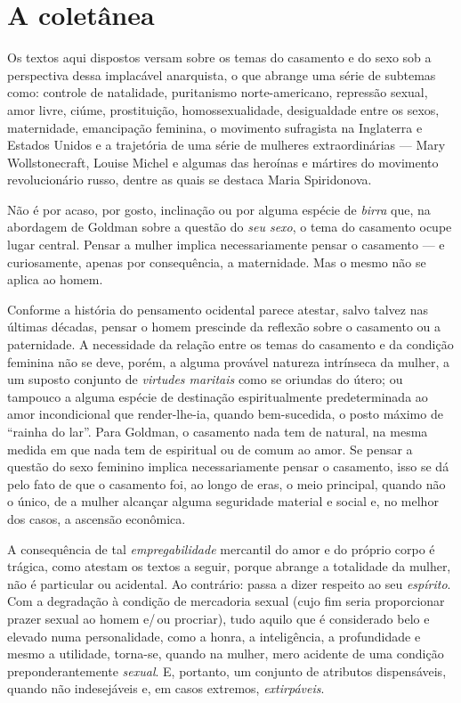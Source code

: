 \section{A coletânea}

Os textos aqui dispostos versam sobre os temas do casamento e do sexo
sob a perspectiva dessa implacável anarquista, o que abrange uma série
de subtemas como: controle de natalidade, puritanismo
norte-americano, repressão sexual, amor livre, ciúme,
prostituição, homossexualidade, desigualdade entre os sexos,
maternidade, emancipação feminina, o movimento sufragista na
Inglaterra e Estados Unidos e a trajetória de uma série de mulheres
extraordinárias --- Mary Wollstonecraft, Louise Michel e algumas das
heroínas e mártires do movimento revolucionário russo, dentre as quais
se destaca Maria Spiridonova.

Não é por acaso, por gosto, inclinação ou por alguma espécie de
\textit{birra} que, na abordagem de Goldman sobre a questão do \textit{seu sexo},
o tema do casamento ocupe lugar central. Pensar a mulher implica
necessariamente pensar o casamento --- e curiosamente, apenas por
consequência, a maternidade.
Mas o mesmo não se aplica ao homem.

Conforme a história do pensamento ocidental parece atestar,
salvo talvez nas últimas décadas, pensar o homem prescinde da
reflexão sobre o casamento ou a paternidade. A necessidade da
relação entre os temas do casamento e da condição feminina não se deve,
porém, a alguma provável natureza intrínseca da mulher, a um suposto
conjunto de \textit{virtudes maritais} como se oriundas do útero; ou tampouco
a alguma espécie de destinação espiritualmente predeterminada ao amor
incondicional que render-lhe-ia, quando bem-sucedida, o posto máximo de
``rainha do lar''. Para Goldman, o casamento nada tem de natural, na
mesma medida em que nada tem de espiritual ou de comum ao amor. Se
pensar a questão do sexo feminino implica necessariamente pensar o
casamento, isso se dá pelo fato de que o casamento foi, ao longo de
eras, o meio principal, quando não o único, de a mulher alcançar alguma
seguridade material e social e, no melhor dos casos, a
ascensão econômica.

A consequência de tal \textit{empregabilidade} mercantil do amor e do próprio
corpo é trágica, como atestam os textos a seguir, porque abrange
a totalidade da mulher, não é particular ou acidental.
Ao contrário: passa a dizer respeito ao seu
\textit{espírito}. Com a degradação à condição de mercadoria sexual (cujo
fim seria proporcionar prazer sexual ao homem e/\,ou procriar),
tudo aquilo que é considerado belo e elevado numa personalidade, como a
honra, a inteligência, a profundidade e mesmo a utilidade, torna-se,
quando na mulher, mero acidente de uma condição
preponderantemente \textit{sexual}. E, portanto, um conjunto de atributos
dispensáveis, quando não indesejáveis e, em casos extremos,
\emph{extirpáveis}.

